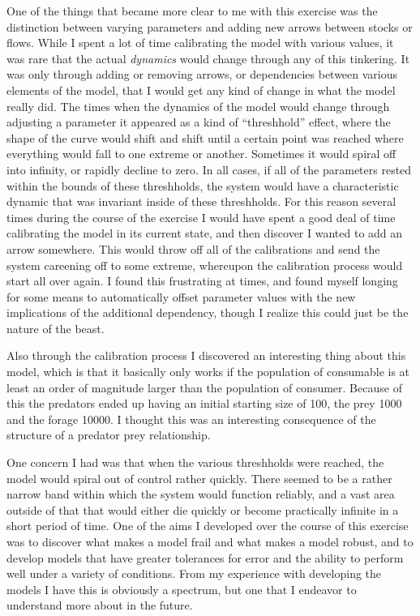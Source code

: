 \documentclass[12pt]{article}
\begin{document}
One of the things that became more clear to me with this exercise was the distinction between varying parameters and adding new arrows between stocks or flows.  While I spent a lot of time calibrating the model with various values, it was rare that the actual {\em dynamics} would change through any of this tinkering.  It was only through adding or removing arrows, or dependencies between various elements of the model, that I would get any kind of change in what the model really did.  The times when the dynamics of the model would change through adjusting a parameter it appeared as a kind of ``threshhold'' effect, where the shape of the curve would shift and shift until a certain point was reached where everything would fall to one extreme or another.  Sometimes it would spiral off into infinity, or rapidly decline to zero.  In all cases, if all of the parameters rested within the bounds of these threshholds, the system would have a characteristic dynamic that was invariant inside of these threshholds.  For this reason several times during the course of the exercise I would have spent a good deal of time calibrating the model in its current state, and then discover I wanted to add an arrow somewhere.  This would throw off all of the calibrations and send the system careening off to some extreme, whereupon the calibration process would start all over again.  I found this frustrating at times, and found myself longing for some means to automatically offset parameter values with the new implications of the additional dependency, though I realize this could just be the nature of the beast.  

Also through the calibration process I discovered an interesting thing about this model, which is that it basically only works if the population of consumable is at least an order of magnitude larger than the population of consumer.  Because of this the predators ended up having an initial starting size of 100, the prey 1000 and the forage 10000.  I thought this was an interesting consequence of the structure of a predator prey relationship.   

One concern I had was that when the various threshholds were reached, the model would spiral out of control rather quickly.  There seemed to be a rather narrow band within which the system would function reliably, and a vast area outside of that that would either die quickly or become practically infinite in a short period of time.  One of the aims I developed over the course of this exercise was to discover what makes a model frail and what makes a model robust, and to develop models that have greater tolerances for error and the ability to perform well under a variety of conditions.  From my experience with developing the models I have this is obviously a spectrum, but one that I endeavor to understand more about in the future.
\end{document}
